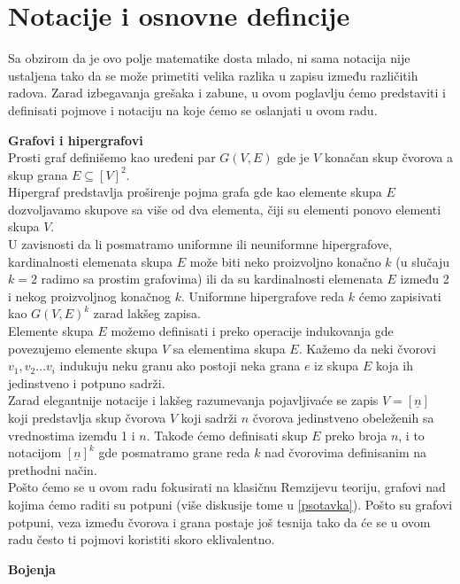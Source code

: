 \documentclass[a4paper]{article}
\begin{document}
	\section{Notacije i osnovne defincije}
	Sa obzirom da je ovo polje matematike dosta mlado, ni sama notacija nije ustaljena tako da se može primetiti velika razlika u zapisu između različitih radova. Zarad izbegavanja grešaka i zabune, u ovom poglavlju ćemo predstaviti i definisati pojmove i notaciju na koje ćemo se oslanjati u ovom radu.
	\newline
	\begin{description}
		\item \textbf{Grafovi i hipergrafovi}\\
		Prosti graf definišemo kao uređeni par $G(V,E)$ gde je $V$ konačan skup čvorova a skup grana $E\subseteq[V]^2$. \\
		Hipergraf predstavlja proširenje pojma grafa gde kao elemente skupa $E$ dozvoljavamo skupove sa više od dva elementa, čiji su elementi ponovo elementi skupa $V$.\\ U zavisnosti da li posmatramo uniformne ili neuniformne hipergrafove, kardinalnosti elemenata skupa $E$ može biti neko proizvoljno konačno $k$ (u slučaju $k=2$ radimo sa prostim grafovima) ili da su kardinalnosti elemenata $E$ između 2 i nekog proizvoljnog konačnog $k$. Uniformne hipergrafove reda $k$ ćemo zapisivati kao $G(V, E)^k$ zarad lakšeg zapisa. \\
		Elemente skupa $E$ možemo definisati i preko operacije indukovanja gde povezujemo elemente skupa $V$ sa elementima skupa $E$. Kažemo da neki čvorovi $v_1, v_2 \dots v_i$ indukuju neku granu ako postoji neka grana $e$ iz skupa $E$ koja ih jedinstveno i potpuno sadrži. \\%
		Zarad elegantnije notacije i lakšeg razumevanja pojavljivaće se zapis $V=[\underline{n}]$ koji predstavlja skup čvorova $V$ koji sadrži $n$ čvorova jedinstveno obeleženih sa vrednostima izemđu 1 i $n$. Takođe ćemo definisati skup $E$ preko broja $n$, i to notacijom $[\underline{n}]^k$ gde posmatramo grane reda $k$ nad čvorovima definisanim na prethodni način.
		\\
		Pošto ćemo se u ovom radu fokusirati na klasičnu Remzijevu teoriju, grafovi nad kojima ćemo raditi su potpuni (više diskusije  tome u \ref{psotavka}). Pošto su grafovi potpuni, veza između čvorova i grana postaje još tesnija tako da će se u ovom radu često ti pojmovi koristiti skoro eklivalentno. \\
		\item \textbf{Bojenja} \\

\end{description}
\end{document}
